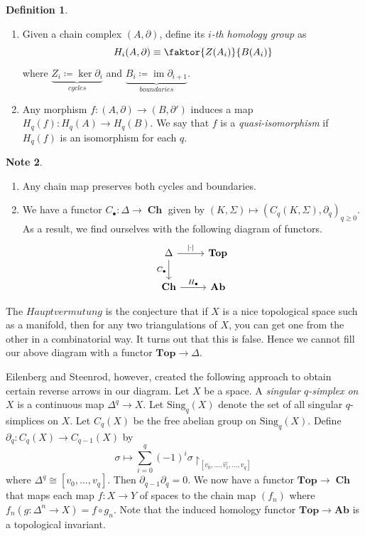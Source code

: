 \documentclass[10pt,letterpaper,cm]{nupset}
\theoremstyle{definition}
\newtheorem{definition}{Definition}[subsection]
\newtheorem{note}[definition]{Note}
\theoremstyle{theorem}
\theoremstyle{remark}
\newcommand{\1}{\mathbb{1}}
\newcommand{\0}{\vec 0}
\DeclareMathOperator{\im}{im}
\DeclareMathOperator{\ch}{\mathbf{Ch}}
\begin{document}
\pagebreak

\begin{definition} $ $
\begin{enumerate}
\item Given a chain complex $\left(A, \partial\right)$, define its \textit{$i$-th homology group} as $$ H_i(A, \partial) \equiv \faktor{Z(A_i)}{B(A_i)} $$ where $\underbrace{Z_i \coloneqq  \ker{\partial_{i}}}_{\textit{cycles}}$ and $\underbrace{B_i \coloneqq  \im{\partial_{i+1}}}_{\textit{boundaries}}$. 
\item Any morphism $f: \left(A, \partial\right) \to \left(B, \partial '\right)$ induces a map $H_q(f) : H_q(A) \to H_q(B)$. We say that $f$ is a \textit{quasi-isomorphism} if $H_q(f)$ is an isomorphism for each $q$. 
\end{enumerate}
\end{definition}

\begin{note} $ $
\begin{enumerate}
\item Any chain map preserves both cycles and boundaries.
\item We have a functor $C_{\bullet}: \Delta \to \ch$ given by $\left(K, \Sigma\right) \mapsto \left(C_q(K, \Sigma), \partial_{q}\right)_{q\geq 0}$. As a result, we find ourselves with the following diagram of functors.
\[
\begin{tikzcd}
\Delta \arrow[d, "C_{\bullet}"'] \arrow[r, "\left\lvert{\cdot}\right\rvert"] & \mathbf{Top} \\
\ch \arrow[r, "H_{\bullet}"] & \mathbf{Ab}
\end{tikzcd}
\]
\end{enumerate}
\end{note}

\smallskip

The $\textit{Hauptvermutung}$ is the conjecture that if $X$ is a nice topological space such as a manifold, then for any two triangulations of $X$, you  can get one from the other in a combinatorial way. It turns out that this is false. Hence we cannot fill our above diagram with a functor $\mathbf{Top} \to \Delta$.

Eilenberg and Steenrod, however, created the following approach to obtain certain reverse arrows in our diagram. Let $X$ be a space. A \textit{singular $q$-simplex on $X$}  is a continuous map $\Delta^q \to X$. Let $\text{Sing}_q(X)$ denote the set of all singular $q$-simplices on $X$. Let $C_q(X)$ be the free abelian group on $\text{Sing}_q(X)$. Define $\partial_{q} : C_q(X) \to C_{q-1}(X)$ by 
$$\sigma \mapsto \sum_{i=0}^q({-1})^i \sigma \restriction_{\left[v_0, \ldots, \widehat{v_i}, \ldots, v_q\right]}$$ 
where $\Delta^q \cong \left[v_0, \ldots, v_q\right]$. Then $\partial_{q-1}\partial_q =0$. We now have a functor $\mathbf{Top} \to \ch$ that maps each map $f: X \to Y$ of spaces to the chain map $\left(f_n\right)$ where $f_n(g: \Delta^n \to X) = f \circ g_n$. Note that the induced homology functor $\mathbf{Top} \to \mathbf{Ab}$ is a topological invariant. 
\end{document}

